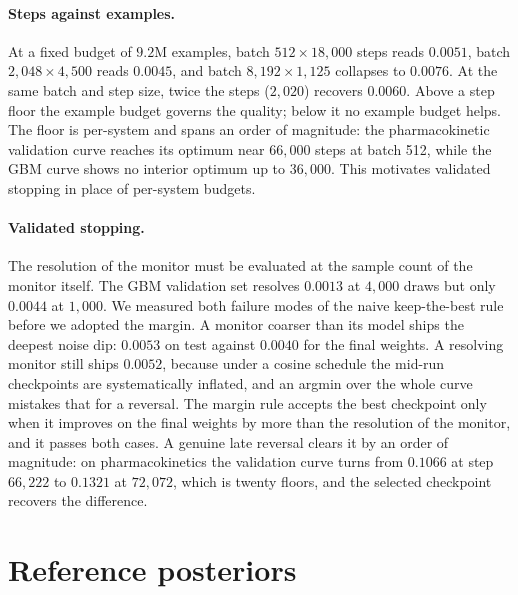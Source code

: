 \documentclass[10pt]{article}
\begin{document}
\paragraph{Steps against examples.} At a fixed budget of $9.2$M examples, batch $512 \times 18{,}000$
steps reads $0.0051$, batch $2{,}048 \times 4{,}500$ reads $0.0045$, and batch
$8{,}192 \times 1{,}125$ collapses to $0.0076$. At the same batch and step size, twice the steps
($2{,}020$) recovers $0.0060$. Above a step floor the example budget governs the quality; below it no
example budget helps. The floor is per-system and spans an order of magnitude: the pharmacokinetic
validation curve reaches its optimum near $66{,}000$ steps at batch 512, while the GBM curve shows no
interior optimum up to $36{,}000$. This motivates validated stopping in place of per-system budgets.

\paragraph{Validated stopping.} The resolution of the monitor must be evaluated at the sample count
of the monitor itself. The GBM validation set resolves $0.0013$ at $4{,}000$ draws but only $0.0044$
at $1{,}000$. We measured both failure modes of the naive keep-the-best rule before we adopted the
margin. A monitor coarser than its model ships the deepest noise dip: $0.0053$ on test against
$0.0040$ for the final weights. A resolving monitor still ships $0.0052$, because under a cosine
schedule the mid-run checkpoints are systematically inflated, and an argmin over the whole curve
mistakes that for a reversal. The margin rule accepts the best checkpoint only when it improves on
the final weights by more than the resolution of the monitor, and it passes both cases. A genuine late
reversal clears it by an order of magnitude: on pharmacokinetics the validation curve turns from
$0.1066$ at step $66{,}222$ to $0.1321$ at $72{,}072$, which is twenty floors, and the selected
checkpoint recovers the difference.

\section{Reference posteriors}
\label{app:refs}
\end{document}
